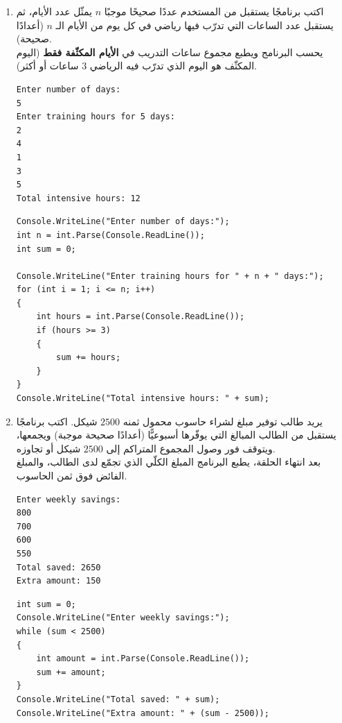 \documentclass[14pt]{extarticle}
\begin{document}
\begin{enumerate}[itemsep=2em]
\item اكتب برنامجًا يستقبل من المستخدم عددًا صحيحًا موجبًا $n$ يمثّل عدد الأيام، ثم يستقبل عدد الساعات التي تدرّب فيها رياضي في كل يوم من الأيام الـ $n$ (أعدادًا صحيحة). \\
يحسب البرنامج ويطبع مجموع ساعات التدريب في \textbf{الأيام المكثّفة فقط} (اليوم المكثّف هو اليوم الذي تدرّب فيه الرياضي $3$ ساعات أو أكثر).
\ifdetailed
\begin{boxExample}
\begin{english}
\begin{verbatim}
Enter number of days:
5
Enter training hours for 5 days:
2
4
1
3
5
Total intensive hours: 12
\end{verbatim}
\end{english}
\end{boxExample}
\fi
\ifwithsols
\begin{boxSolution}
\begin{english}
\begin{verbatim}
Console.WriteLine("Enter number of days:");
int n = int.Parse(Console.ReadLine());
int sum = 0;

Console.WriteLine("Enter training hours for " + n + " days:");
for (int i = 1; i <= n; i++)
{
    int hours = int.Parse(Console.ReadLine());
    if (hours >= 3)
    {
        sum += hours;
    }
}
Console.WriteLine("Total intensive hours: " + sum);
\end{verbatim}
\end{english}
\end{boxSolution}
\fi
\filbreak

\item يريد طالب توفير مبلغ لشراء حاسوب محمول ثمنه $2500$ شيكل. اكتب برنامجًا يستقبل من الطالب المبالغ التي يوفّرها أسبوعيًّا (أعدادًا صحيحة موجبة) ويجمعها، ويتوقف فور وصول المجموع المتراكم إلى $2500$ شيكل أو تجاوزه. \\
بعد انتهاء الحلقة، يطبع البرنامج المبلغ الكلّي الذي تجمّع لدى الطالب، والمبلغ الفائض فوق ثمن الحاسوب.
\ifdetailed
\begin{boxExample}
\begin{english}
\begin{verbatim}
Enter weekly savings:
800
700
600
550
Total saved: 2650
Extra amount: 150
\end{verbatim}
\end{english}
\end{boxExample}
\fi
\ifwithsols
\begin{boxSolution}
\begin{english}
\begin{verbatim}
int sum = 0;
Console.WriteLine("Enter weekly savings:");
while (sum < 2500)
{
    int amount = int.Parse(Console.ReadLine());
    sum += amount;
}
Console.WriteLine("Total saved: " + sum);
Console.WriteLine("Extra amount: " + (sum - 2500));
\end{verbatim}
\end{english}
\end{boxSolution}
\fi
\filbreak


\end{enumerate}
\end{document}
